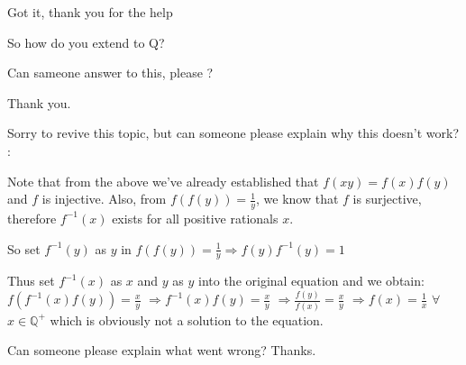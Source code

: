 \begin{solution}
	Got it, thank you for the help
\end{solution}



\begin{solution}
	\begin{tcolorbox}So how do you extend to Q?\end{tcolorbox}
Can sameone answer to this, please ?
\end{solution}






\begin{solution}
	Thank you.
\end{solution}



\begin{solution}
	Sorry to revive this topic, but can someone please explain why this doesn't work? :

Note that from the above we've already established that $f(xy)=f(x)f(y)$ and $f$ is injective.
Also, from $ f(f(y)) = \frac{1}{y} $, we know that $ f $ is surjective, therefore $ f^{-1}(x) $ exists for all positive rationals $ x $.

So set $ f^{-1}(y)$ as $ y $ in $ f(f(y)) = \frac{1}{y} \Rightarrow f(y)f^{-1}(y) = 1 $

Thus set $ f^{-1}(x) $ as $ x $ and $ y $ as $ y $ into the original equation and we obtain:
$ f(f^{-1}(x)f(y)) = \frac{x}{y} $
$ \Rightarrow f^{-1}(x)f(y) = \frac{x}{y} $
$ \Rightarrow \frac{f(y)}{f(x)} = \frac{x}{y} $
$ \Rightarrow f(x) = \frac{1}{x} $ $\forall$  $ x \in \mathbb{Q}^{+} $
which is obviously not a solution to the equation.

Can someone please explain what went wrong? Thanks.
\end{solution}




